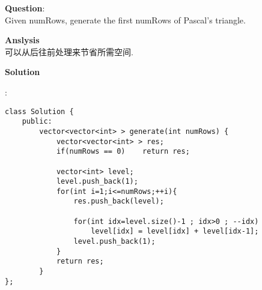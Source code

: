     
\begin{description}
    \item{\textbf{Question}}:\\%
		Given numRows, generate the first numRows of Pascal's triangle.\\

    \item{\textbf{Anslysis}}\\
		可以从后往前处理来节省所需空间.\\

    \item{\textbf{Solution}}\\
	\item{} : \\
		\begin{lstlisting}
class Solution {
	public:
		vector<vector<int> > generate(int numRows) {
			vector<vector<int> > res;
			if(numRows == 0)	return res;

			vector<int> level;
			level.push_back(1);
			for(int i=1;i<=numRows;++i){
				res.push_back(level);

				for(int idx=level.size()-1 ; idx>0 ; --idx)
					level[idx] = level[idx] + level[idx-1];
				level.push_back(1);
			}
			return res;
		}
};
		\end{lstlisting}

\end{description}

